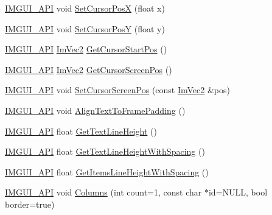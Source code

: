 \begin{DoxyCompactItemize}
\item 
\mbox{\hyperlink{imgui_8h_a43829975e84e45d1149597467a14bbf5}{I\+M\+G\+U\+I\+\_\+\+A\+PI}} void \mbox{\hyperlink{namespace_im_gui_a8f56616f8d0b35e6e756c0b7f198ac0f}{Set\+Cursor\+PosX}} (float x)
\item 
\mbox{\hyperlink{imgui_8h_a43829975e84e45d1149597467a14bbf5}{I\+M\+G\+U\+I\+\_\+\+A\+PI}} void \mbox{\hyperlink{namespace_im_gui_a0174d351957d5c5677ebc214dd54f499}{Set\+Cursor\+PosY}} (float y)
\item 
\mbox{\hyperlink{imgui_8h_a43829975e84e45d1149597467a14bbf5}{I\+M\+G\+U\+I\+\_\+\+A\+PI}} \mbox{\hyperlink{struct_im_vec2}{Im\+Vec2}} \mbox{\hyperlink{namespace_im_gui_a8ee9647de3b39fc7b77395082fc9e0cc}{Get\+Cursor\+Start\+Pos}} ()
\item 
\mbox{\hyperlink{imgui_8h_a43829975e84e45d1149597467a14bbf5}{I\+M\+G\+U\+I\+\_\+\+A\+PI}} \mbox{\hyperlink{struct_im_vec2}{Im\+Vec2}} \mbox{\hyperlink{namespace_im_gui_adb0db3c1ee36f5085f35890a4229ae75}{Get\+Cursor\+Screen\+Pos}} ()
\item 
\mbox{\hyperlink{imgui_8h_a43829975e84e45d1149597467a14bbf5}{I\+M\+G\+U\+I\+\_\+\+A\+PI}} void \mbox{\hyperlink{namespace_im_gui_a632bc7e15b8258f95ab0bc9b2efd5537}{Set\+Cursor\+Screen\+Pos}} (const \mbox{\hyperlink{struct_im_vec2}{Im\+Vec2}} \&pos)
\item 
\mbox{\hyperlink{imgui_8h_a43829975e84e45d1149597467a14bbf5}{I\+M\+G\+U\+I\+\_\+\+A\+PI}} void \mbox{\hyperlink{namespace_im_gui_ae14be3a3bec106de7c91aaa2a9a558a1}{Align\+Text\+To\+Frame\+Padding}} ()
\item 
\mbox{\hyperlink{imgui_8h_a43829975e84e45d1149597467a14bbf5}{I\+M\+G\+U\+I\+\_\+\+A\+PI}} float \mbox{\hyperlink{namespace_im_gui_aaba5637199d31ea23d4d143b30a44aff}{Get\+Text\+Line\+Height}} ()
\item 
\mbox{\hyperlink{imgui_8h_a43829975e84e45d1149597467a14bbf5}{I\+M\+G\+U\+I\+\_\+\+A\+PI}} float \mbox{\hyperlink{namespace_im_gui_aa1616f6082fd210fde8d98c511bf8f56}{Get\+Text\+Line\+Height\+With\+Spacing}} ()
\item 
\mbox{\hyperlink{imgui_8h_a43829975e84e45d1149597467a14bbf5}{I\+M\+G\+U\+I\+\_\+\+A\+PI}} float \mbox{\hyperlink{namespace_im_gui_a85a5202a65c0663858dba55a206761c5}{Get\+Items\+Line\+Height\+With\+Spacing}} ()
\item 
\mbox{\hyperlink{imgui_8h_a43829975e84e45d1149597467a14bbf5}{I\+M\+G\+U\+I\+\_\+\+A\+PI}} void \mbox{\hyperlink{namespace_im_gui_a0e2889956542527c4039b6b8bf5c2a38}{Columns}} (int count=1, const char $\ast$id=N\+U\+LL, bool border=true)

\end{DoxyCompactItemize}
